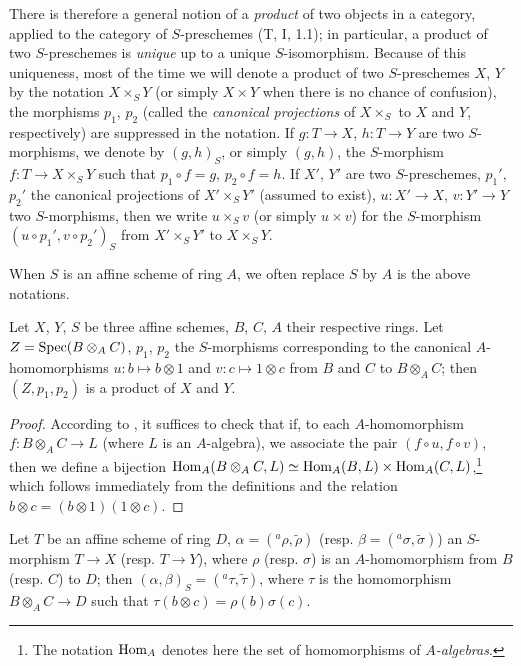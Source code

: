 There is therefore a general notion of a \emph{product} of two objects in a category, applied
to the category of $S$-preschemes (T, I, 1.1); in particular, a product of two $S$-preschemes
is \emph{unique} up to a unique $S$-isomorphism. Because of this uniqueness, most of the time
we will denote a product of two $S$-preschemes $X$, $Y$ by the notation $X\times_S Y$ (or
simply $X\times Y$ when there is no chance of confusion), the morphisms $p_1$, $p_2$ (called
the \emph{canonical projections} of $X\times_S$ to $X$ and $Y$, respectively) are suppressed
in the notation. If $g:T\to X$, $h:T\to Y$ are two $S$-morphisms, we denote by $(g,h)_S$, or
simply $(g,h)$, the $S$-morphism $f:T\to X\times_S Y$ such that $p_1\circ f=g$,
$p_2\circ f=h$. If $X'$, $Y'$ are two $S$-preschemes, $p_1'$, $p_2'$ the canonical
projections of $X'\times_S Y'$ (assumed to exist), $u:X'\to X$, $v:Y'\to Y$ two
$S$-morphisms, then we write $u\times_S v$ (or simply $u\times v$) for the $S$-morphism
$(u\circ p_1',v\circ p_2')_S$ from $X'\times_S Y'$ to $X\times_S Y$.

When $S$ is an affine scheme of ring $A$, we often replace $S$
by $A$ is the above notations.

\begin{prop}[3.2.2]
\label{1.3.2.2}
Let $X$, $Y$, $S$ be three affine schemes, $B$, $C$, $A$ their respective rings. Let
$Z={\mathop{\mathrm{Spec}}\nolimits}(B\otimes_A C)$, $p_1$, $p_2$ the $S$-morphisms corresponding  to
the canonical $A$-homomorphisms $u:b\mapsto b\otimes 1$ and $v:c\mapsto 1\otimes c$ from $B$
and $C$ to $B\otimes_A C$; then $(Z,p_1,p_2)$ is a product of $X$ and $Y$.
\end{prop}

\begin{proof}
\label{proof-1.3.2.2}
According to , it suffices to check that if, to each $A$-homomorphism
$f:B\otimes_A C\to L$ (where $L$ is an $A$-algebra), we associate the pair
$(f\circ u,f\circ v)$, then we define a bijection
${\mathop{\mathrm{Hom}}\nolimits}_A(B\otimes_A C,L)\simeq{\mathop{\mathrm{Hom}}\nolimits}_A(B,L)\times{\mathop{\mathrm{Hom}}\nolimits}_A(C,L)$,\footnote{The notation ${\mathop{\mathrm{Hom}}\nolimits}_A$
denotes here the set of homomorphisms of \emph{$A$-algebras}.} which follows immediately
from the definitions and the relation $b\otimes c=(b\otimes 1)(1\otimes c)$.
\end{proof}

\begin{cor}[3.2.3]
\label{1.3.2.3}
Let $T$ be an affine scheme of ring $D$, $\alpha=({}^a\rho,\widetilde{\rho})$
(resp. $\beta=({}^a\sigma,\widetilde{\sigma})$) an $S$-morphism $T\to X$ (resp. $T\to Y$),
where $\rho$ (resp. $\sigma$) is an $A$-homomorphism from $B$ (resp. $C$) to $D$; then
$(\alpha,\beta)_S=({}^a\tau,\widetilde{\tau})$, where $\tau$ is the homomorphism
$B\otimes_A C\to D$ such that $\tau(b\otimes c)=\rho(b)\sigma(c)$.
\end{cor}

